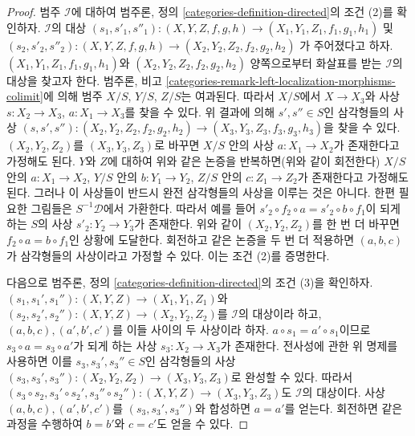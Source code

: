 \begin{proof}
\medskip\noindent
범주 $\mathcal{I}$에 대하여 범주론, 정의
\ref{categories-definition-directed}의 조건 (2)를 확인하자.
$\mathcal{I}$의 대상
$(s_1, s'_1, s''_1) : (X, Y, Z, f, g, h) \to (X_1, Y_1, Z_1, f_1, g_1, h_1)$
및
$(s_2, s'_2, s''_2) : (X, Y, Z, f, g, h) \to (X_2, Y_2, Z_2, f_2, g_2, h_2)$
가 주어졌다고 하자. $(X_1, Y_1, Z_1, f_1, g_1, h_1)$와
$(X_2, Y_2, Z_2, f_2, g_2, h_2)$ 양쪽으로부터 화살표를 받는
$\mathcal{I}$의 대상을 찾고자 한다. 범주론, 비고
\ref{categories-remark-left-localization-morphisms-colimit}에 의해
범주 $X/S$, $Y/S$, $Z/S$는 여과된다. 따라서 $X/S$에서
$X \to X_3$와 사상 $s : X_2 \to X_3$, $a : X_1 \to X_3$를
찾을 수 있다. 위 결과에 의해 $s', s'' \in S$인 삼각형들의 사상
$(s, s', s'') : (X_2, Y_2, Z_2, f_2, g_2, h_2) \to
(X_3, Y_3, Z_3, f_3, g_3, h_3)$을 찾을 수 있다.
$(X_2, Y_2, Z_2)$를 $(X_3, Y_3, Z_3)$로 바꾸면
$X/S$ 안의 사상 $a : X_1 \to X_2$가 존재한다고 가정해도 된다.
$Y$와 $Z$에 대하여 위와 같은 논증을 반복하면(위와 같이 회전한다)
$X/S$ 안의 $a : X_1 \to X_2$, $Y/S$ 안의 $b : Y_1 \to Y_2$,
$Z/S$ 안의 $c : Z_1 \to Z_2$가 존재한다고 가정해도 된다.
그러나 이 사상들이 반드시 완전 삼각형들의 사상을 이루는 것은 아니다.
한편 필요한 그림들은 $S^{-1}\mathcal{D}$에서 가환한다. 따라서 예를 들어
$s'_2 \circ f_2 \circ a = s'_2 \circ b \circ f_1$이 되게 하는
$S$의 사상 $s'_2 : Y_2 \to Y_3$가 존재한다. 위와 같이
$(X_2, Y_2, Z_2)$를 한 번 더 바꾸면 $f_2 \circ a = b \circ f_1$인
상황에 도달한다. 회전하고 같은 논증을 두 번 더 적용하면
$(a, b, c)$가 삼각형들의 사상이라고 가정할 수 있다. 이는 조건 (2)를
증명한다.

\medskip\noindent
다음으로 범주론, 정의 \ref{categories-definition-directed}의 조건 (3)을
확인하자. $(s_1, s_1', s_1'') : (X, Y, Z) \to (X_1, Y_1, Z_1)$와
$(s_2, s_2', s_2'') : (X, Y, Z) \to (X_2, Y_2, Z_2)$를
$\mathcal{I}$의 대상이라 하고, $(a, b, c), (a', b', c')$를
이들 사이의 두 사상이라 하자. $a \circ s_1 = a' \circ s_1$이므로
$s_3 \circ a = s_3 \circ a'$가 되게 하는 사상
$s_3 : X_2 \to X_3$가 존재한다. 전사성에 관한 위 명제를 사용하면 이를
$s_3, s_3', s_3'' \in S$인 삼각형들의 사상
$(s_3, s_3', s_3'') : (X_2, Y_2, Z_2) \to (X_3, Y_3, Z_3)$로
완성할 수 있다. 따라서
$(s_3 \circ s_2, s_3' \circ s_2', s_3'' \circ s_2'') :
(X, Y, Z) \to (X_3, Y_3, Z_3)$도 $\mathcal{I}$의 대상이다.
사상 $(a, b, c), (a', b', c')$를 $(s_3, s_3', s_3'')$와 합성하면
$a = a'$를 얻는다. 회전하면 같은 과정을 수행하여
$b = b'$와 $c = c'$도 얻을 수 있다.


\end{proof}
